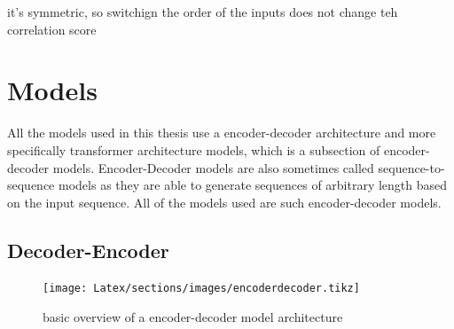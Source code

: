 it's symmetric, so switchign the order of the inputs does not change teh correlation score

\section{Models}
\label{ch:models}
All the models used in this thesis use a encoder-decoder architecture and more specifically transformer architecture models, which is a subsection of encoder-decoder models. Encoder-Decoder models are also sometimes called sequence-to-sequence models as they are able to generate sequences of arbitrary length based on the input sequence.
All of the models used are such encoder-decoder models. 

\subsection{Decoder-Encoder}
\begin{figure}[]
    \centering%
    \texttt{[image: Latex/sections/images/encoderdecoder.tikz]}
    \caption{basic overview of a encoder-decoder model architecture}
    \label{fig:encoderdecodermodel}
\end{figure}

